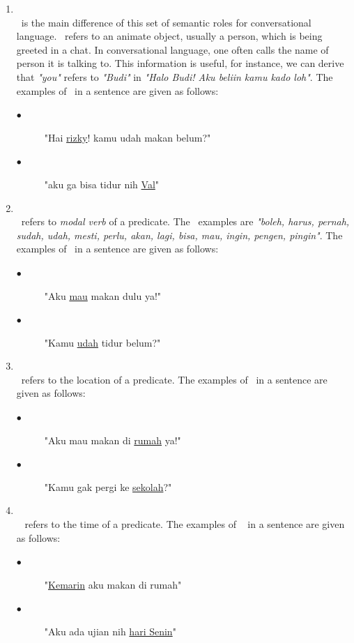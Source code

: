 \begin{enumerate}
	\item \greet\\
	\greet~is the main difference of this set of semantic roles for conversational language. \greet~refers to an animate object, usually a person, which is being greeted in a chat. In conversational language, one often calls the name of person it is talking to. This information is useful, for instance, we can derive that \textit{"you"} refers to \textit{"Budi"} in \textit{"Halo Budi! Aku beliin kamu kado loh"}. The examples of \greet~in a sentence are given as follows:
	\begin{description}
		\item[$\bullet$] "Hai \underline{rizky}! kamu udah makan belum?"
		\item[$\bullet$] "aku ga bisa tidur nih \underline{Val}"
	\end{description}

	\item \modal\\
	\modal~refers to \textit{modal verb} of a predicate. The \modal~examples are \textit{"boleh, harus, pernah, sudah, udah, mesti, perlu, akan, lagi, bisa, mau, ingin, pengen, pingin"}. The examples of \modal~in a sentence are given as follows:
	\begin{description}
		\item[$\bullet$] "Aku \underline{mau} makan dulu ya!"
		\item[$\bullet$] "Kamu \underline{udah} tidur belum?"
	\end{description}

	\item \location\\
	\location~refers to the location of a predicate. The examples of \location~in a sentence are given as follows:
	\begin{description}
		\item[$\bullet$] "Aku mau makan di \underline{rumah} ya!"
		\item[$\bullet$] "Kamu gak pergi ke \underline{sekolah}?"
	\end{description}

	\item \timesrl\\
	\timesrl~ refers to the time of a predicate. The examples of \timesrl~ in a sentence are given as follows:
	\begin{description}
		\item[$\bullet$] "\underline{Kemarin} aku makan di rumah"
		\item[$\bullet$] "Aku ada ujian nih \underline{hari Senin}"
	\end{description}
\end{enumerate}


